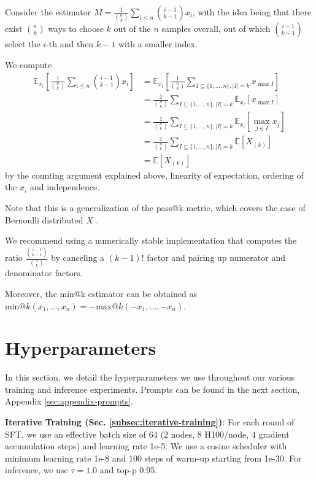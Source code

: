 Consider the estimator $
M = \frac{1}{\binom{n}{k}}\sum_{i \leq n} \binom{i-1}{k-1} x_i$,
with the idea being that there exist $\binom{n}{k}$ ways to choose $k$ out of the $n$ samples overall, out of which $\binom{i-1}{k-1}$ select the $i$-th and then $k-1$ with a smaller index.

We compute
\begin{align*}
\mathbb{E}_{x_i}\left[\frac{1}{\binom{n}{k}}\sum_{i \leq n} \binom{i-1}{k-1} x_i\right]
&= \mathbb{E}_{x_i}\left[ \frac{1}{\binom{n}{k}} \sum_{I \subseteq \{1, \ldots, n\}, |I| = k} x_{\max I} \right]  \\
&= \frac{1}{\binom{n}{k}} \sum_{I \subseteq \{1, \ldots, n\}, |I| = k} \mathbb{E}_{x_i}\left[ x_{\max I} \right]  \\
&= \frac{1}{\binom{n}{k}} \sum_{I \subseteq \{1, \ldots, n\}, |I| = k} \mathbb{E}_{x_i}\left[ \max_{j \in I} x_j \right] \\
&= \frac{1}{\binom{n}{k}} \sum_{I \subseteq \{1, \ldots, n\}, |I| = k} \mathbb{E} \left[ X_{(k)} \right] \\
&= \mathbb{E}\left[ X_{(k)} \right] 
\end{align*}
by the counting argument explained above, linearity of expectation, ordering of the $x_i$ and independence. 

Note that this is a generalization of the pass@k metric, which covers the case of Bernoulli distributed  $X$ \citep{chen2021evaluatinglargelanguagemodels}.

We recommend using a numerically stable implementation that computes the ratio $\frac{\binom{i-1}{k-1}}{\binom{n}{k}}$ by canceling a $(k-1)!$ factor and pairing up numerator and denominator factors.

Moreover, the min@k estimator can be obtained as $\text{min@}k(x_1, \ldots, x_n) = -\text{max@}k(-x_1, \ldots, -x_n)$.
\vfill


\newpage
\section{Hyperparameters}

In this section, we detail the hyperparameters we use throughout our various training and inference experiments. Prompts can be found in the next section, Appendix \ref{sec:appendix-prompts}.

\textbf{Iterative Training (Sec. \ref{subsec:iterative-training})}: For each round of SFT, we use an effective batch size of $64$ ($2$ nodes, $8$ H100/node, $4$ gradient accumulation steps) and learning rate 1e-5. We use a cosine scheduler with minimum learning rate 1e-8 and $100$ steps of warm-up starting from 1e-30. For inference, we use $\tau=1.0$ and top-p 0.95.


